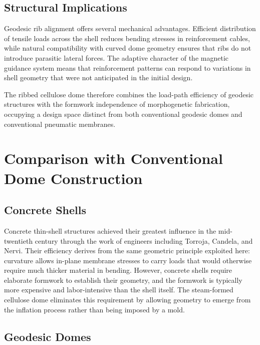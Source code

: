 \documentclass[12pt,a4paper]{article}
\begin{document}
\subsection{Structural Implications}

Geodesic rib alignment offers several mechanical advantages. Efficient
distribution of tensile loads across the shell reduces bending stresses
in reinforcement cables, while natural compatibility with curved dome
geometry ensures that ribs do not introduce parasitic lateral forces.
The adaptive character of the magnetic guidance system means that
reinforcement patterns can respond to variations in shell geometry that
were not anticipated in the initial design.

The ribbed cellulose dome therefore combines the load-path efficiency
of geodesic structures with the formwork independence of morphogenetic
fabrication, occupying a design space distinct from both conventional
geodesic domes and conventional pneumatic membranes.

\section{Comparison with Conventional Dome Construction}

\subsection{Concrete Shells}

Concrete thin-shell structures achieved their greatest influence in the
mid-twentieth century through the work of engineers including Torroja,
Candela, and Nervi. Their efficiency derives from the same geometric
principle exploited here: curvature allows in-plane membrane stresses
to carry loads that would otherwise require much thicker material in
bending. However, concrete shells require elaborate formwork to
establish their geometry, and the formwork is typically more expensive
and labor-intensive than the shell itself. The steam-formed cellulose
dome eliminates this requirement by allowing geometry to emerge from the
inflation process rather than being imposed by a mold.

\subsection{Geodesic Domes}
\end{document}
